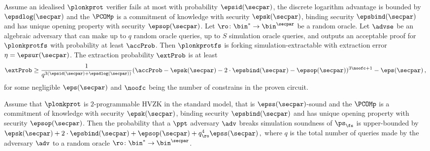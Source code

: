 \begin{corollary}
	\label{thm:plonkprotfs_se}
	Assume an idealised $\plonkprot$ verifier fails at most with probability
	$\epsid(\secpar)$, the discrete logarithm advantage is bounded by
	$\epsdlog(\secpar)$ and the $\PCOMp$ is a commitment of knowledge with security
	$\epsk(\secpar)$, binding security $\epsbind(\secpar)$ and has unique opening
	property with security $\epsop(\secpar)$. Let
	$\ro\colon \bin^* \to \bin^\secpar$ be a random oracle. Let $\advse$ be an
	algebraic adversary that can make up to $q$ random oracle queries, up to $S$
	simulation oracle queries, and outputs an acceptable proof for $\plonkprotfs$
	with probability at least $\accProb$. Then $\plonkprotfs$ is forking
	simulation-extractable with extraction error $\eta = \epsur(\secpar)$. The
	extraction probability $\extProb$ is at least
	\[
	\extProb \geq \frac{1}{q^{3 (\epsid(\secpar)+\epsdlog(\secpar))}} (\accProb - \epsk(\secpar) - 2\cdot\epsbind(\secpar) -
	\epsop(\secpar))^{3\noofc + 1} -\eps(\secpar)\,,
	\]
	for some negligible $\eps(\secpar)$ and $\noofc$ being the number of
	constrains in the proven circuit.
\end{corollary}

 \begin{corollary}
   \label{thm:simsnd}
   Assume that $\plonkprot$ is $2$-programmable HVZK in the standard model, that
   is $\epss(\secpar)$-sound and the $\PCOMp$ is a commitment of knowledge with
   security $\epsk(\secpar)$, binding security $\epsbind(\secpar)$ and has unique
   opening property with security $\epsop(\secpar)$. Then the probability that a
   $\ppt$ adversary $\adv$ breaks simulation soundness of $\ps_{\fs}$ is
   upper-bounded by
   \( \epsk(\secpar) + 2\cdot\epsbind(\secpar) + \epsop(\secpar) + q_\ro^4
   \epss(\secpar)\,, \) where $q$ is the total number of queries made by the
   adversary $\adv$ to a random oracle $\ro\colon \bin^{*} \to \bin^{\secpar}$.
 \end{corollary}